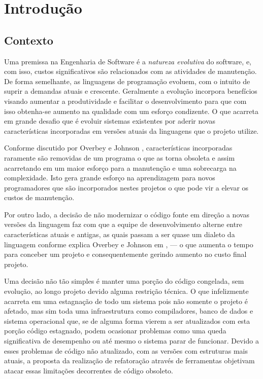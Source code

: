 \chapter{Introdução}



\section{Contexto}
Uma premissa na Engenharia de Software é a \emph{natureza evolutiva} do software, e, com isso, custos significativos são relacionados com as atividades de manutenção. De forma semelhante, as linguagens de programação evoluem, com o intuito de suprir a demandas atuais e crescente. Geralmente a evolução incorpora benefícios visando aumentar a produtividade e facilitar o desenvolvimento para que com isso obtenha-se aumento na qualidade com um esforço condizente. O que acarreta em grande desafio que é evoluir sistemas existentes por aderir novas características incorporadas em versões atuais da linguagens \cite{Dyer:2013} que o projeto utilize.

Conforme discutido por Overbey e Johnson \cite{Overbey:2009}, características incorporadas raramente são removidas de um programa o que as torna obsoleta e assim acarretando em um maior esforço para a manutenção e uma  sobrecarga na complexidade. Isto gera grande esforço na aprendizagem para novos programadores  que são incorporados nestes projetos o que pode vir a elevar os custos de manutenção. 

Por outro lado, a decisão de não modernizar o código fonte em direção a novas versões da linguagem faz com que a equipe de desenvolvimento alterne entre características atuais e antigas, as quais passam a ser quase um dialeto da linguagem conforme explica Overbey e Johnson em \cite{Overbey:2009}, --- o que aumenta o tempo para conceber um projeto e consequentemente gerindo aumento no custo final projeto.

Uma decisão não tão simples é manter uma porção do código congelada, sem evolução, ao longo projeto devido alguma restrição técnica. O que infelizmente acarreta em uma estagnação de todo um sistema pois não somente o projeto é afetado, mas sim toda uma infraestrutura como compiladores, banco de dados e sistema operacional que, se de alguma forma vierem a ser atualizados com esta porção código estagnado, podem ocasionar problemas como uma queda significativa de desempenho ou até mesmo o sistema parar de funcionar. Devido a esses problemas de código não atualizado, com as versões com estruturas mais atuais, a proposta da realização de refatoração através de ferramentas objetivam atacar essas limitações decorrentes de código obsoleto.

